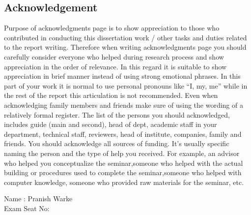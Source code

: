 \documentclass[12pt,a4paper]{report}     %
\begin{document}
\newpage	
\pagestyle{plain}
\pagestyle{fancy}							%
\renewcommand{\headrulewidth}{0pt}
\fancyfoot[LO]{\textit{}}			%
		\pagestyle{plain}           %
		\begin{center}				%
			\begin{LARGE}
	\section*{Acknowledgement}
			\end{LARGE}
		\end{center}
		\begin{normalsize}
{\setlength{\baselineskip}{1.1\baselineskip}
\noindent %
Purpose of acknowledgments page is to show appreciation to those who contributed in
conducting this dissertation work / other tasks and duties related to the report writing. Therefore when writing acknowledgments page you should carefully consider everyone who helped during research process and show appreciation in the order of relevance. In this regard it is suitable to show appreciation in brief manner instead of using strong emotional phrases. 
\newline
In this part of your work it is normal to use personal pronouns like “I, my, me” while in the rest of the report this articulation is not recommended. Even when acknowledging family members and friends make sure of using the wording of a relatively formal register. The list of the persons you should acknowledged, includes guide (main and second), head of dept, academic staff in your department, technical staff, reviewers, head of institute, companies, family and friends. 
\newline
You should acknowledge all sources of funding. It’s usually specific naming the person and the type of help you received. For example, an advisor who helped you conceptualize the seminar,someone who helped with the actual building or procedures used to complete the seminar,someone who helped with computer knowledge, someone who provided raw materials for the seminar, etc.








			\vspace{1.8in}
				\begin{flushright} 
				Name : Pranish Warke\\ %
			    Exam Seat No: \hspace{0.1in} %
				\end{flushright}

}
		\end{normalsize}
		
\end{document}
